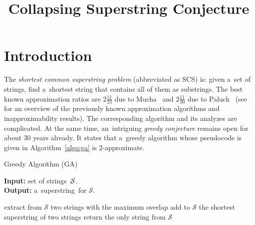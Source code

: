 \documentclass[11pt,letterpaper]{article}
\begin{document}
%

\sloppy
\author{}
\date{}
\title{Collapsing Superstring Conjecture}
\maketitle

\begin{abstract}
\end{abstract}


\section{Introduction}
The {\em shortest common superstring problem} (abbreviated as SCS) is:
given a~set of strings, find a~shortest string that contains all of them as
substrings. The best known approximation ratios are 
$2\frac{11}{23}$ due to Mucha~\cite{M2013} and $2\frac{11}{30}$ due to Paluch~\cite{P14} (see \cite[Section~2.1]{GKM13} for an overview of the 
previously known approximation algorithms
and inapproximability results).
The corresponding algorithm and its analyzes are complicated.
At the same time, an~intriguing {\em greedy conjecture} remains open
for about 30 years already. It states that a~greedy algorithm whose pseudocode is given in Algorithm~\ref{algo:ga} is 2-approximate.

\begin{algorithm}
\label{algo:ga}
\caption{Greedy Algorithm (GA)}
\hspace*{\algorithmicindent} \textbf{Input:} set of strings~${\cal S}$.\\
\hspace*{\algorithmicindent} \textbf{Output:} a~superstring~for $\mathcal{S}$.
\begin{algorithmic}[1]
\State extract from $\mathcal{S}$ two strings with the maximum overlap
\State add to $\mathcal{S}$ the shortest superstring of two strings
\EndWhile
\State return the only string from $\mathcal{S}$
\end{algorithmic}
\end{algorithm}



\end{document}
